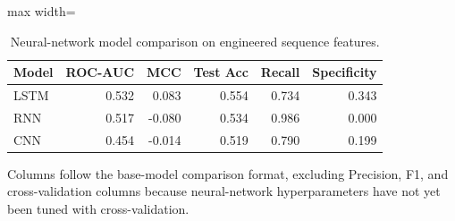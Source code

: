 \begin{table}[htbp]
\centering
\caption{Neural-network model comparison on engineered sequence features.}
\label{tab:nn_comparison}
\begin{adjustbox}{max width=\linewidth}
\begin{tabular}{lrrrrr}
\toprule
Model & ROC-AUC & MCC & Test Acc & Recall & Specificity \\
\midrule
LSTM & 0.532 & 0.083 & 0.554 & 0.734 & 0.343 \\
RNN & 0.517 & -0.080 & 0.534 & 0.986 & 0.000 \\
CNN & 0.454 & -0.014 & 0.519 & 0.790 & 0.199 \\
\bottomrule
\end{tabular}
\end{adjustbox}
\par\smallskip
\footnotesize Columns follow the base-model comparison format, excluding Precision, F1, and cross-validation columns because neural-network hyperparameters have not yet been tuned with cross-validation.
\end{table}
